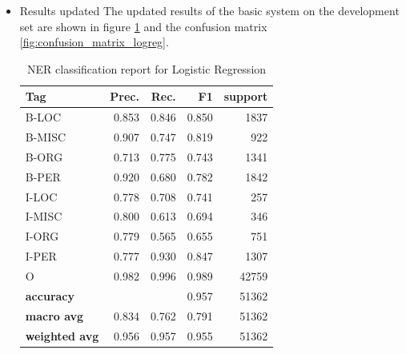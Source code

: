 \documentclass[11pt]{article}
\begin{document}
\begin{itemize}
    \item [] Results updated
          The updated results of the basic system on the development set are shown in figure \ref{tab:evaluation report logreg} and the confusion matrix \ref{fig:confusion_matrix_logreg}.
          \begin{table}[h!]
              \centering
              \caption{NER classification report for Logistic Regression}
              \label{tab:evaluation report logreg}
              \begin{tabular}{l rrrr}
                  \toprule
                  \textbf{Tag}          & \textbf{Prec.}       & \textbf{Rec.} & \textbf{F1} & \textbf{support} \\
                  \midrule
                  B-LOC                 & 0.853                & 0.846         & 0.850       & 1837             \\
                  B-MISC                & 0.907                & 0.747         & 0.819       & 922              \\
                  B-ORG                 & 0.713                & 0.775         & 0.743       & 1341             \\
                  B-PER                 & 0.920                & 0.680         & 0.782       & 1842             \\
                  I-LOC                 & 0.778                & 0.708         & 0.741       & 257              \\
                  I-MISC                & 0.800                & 0.613         & 0.694       & 346              \\
                  I-ORG                 & 0.779                & 0.565         & 0.655       & 751              \\
                  I-PER                 & 0.777                & 0.930         & 0.847       & 1307             \\
                  O                     & 0.982                & 0.996         & 0.989       & 42759            \\
                  \midrule
                  \textbf{accuracy}     & \multicolumn{2}{c}{} & 0.957         & 51362                          \\
                  \textbf{macro avg}    & 0.834                & 0.762         & 0.791       & 51362            \\
                  \textbf{weighted avg} & 0.956                & 0.957         & 0.955       & 51362            \\
                  \bottomrule
              \end{tabular}
          \end{table}


\end{itemize}
\end{document}
